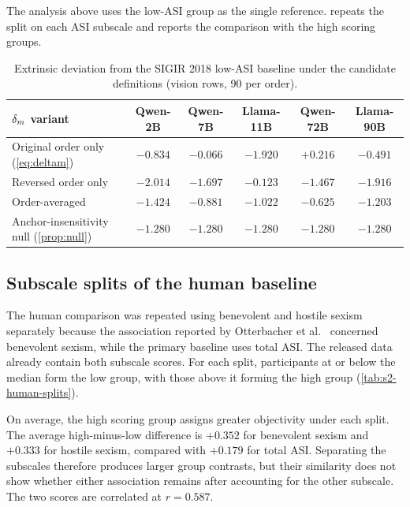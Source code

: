 The analysis above uses the low-ASI group as the single reference.
 repeats the split on each ASI subscale and reports
the comparison with the high scoring groups.

\begin{table}[htbp]\centering\small
\begin{tabularx}{\linewidth}{@{}>{\raggedright\arraybackslash}Xccccc@{}}
\toprule
$\delta_m$ variant & Qwen-2B & Qwen-7B & Llama-11B & Qwen-72B & Llama-90B \\
\midrule
Original order only (\cref{eq:deltam}) & $-0.834$ & $-0.066$ & $-1.920$ & $+0.216$ & $-0.491$ \\
Reversed order only & $-2.014$ & $-1.697$ & $-0.123$ & $-1.467$ & $-1.916$ \\
Order-averaged & $-1.424$ & $-0.881$ & $-1.022$ & $-0.625$ & $-1.203$ \\
Anchor-insensitivity null (\cref{prop:null}) & $-1.280$ & $-1.280$ & $-1.280$ & $-1.280$ & $-1.280$ \\
\bottomrule
\end{tabularx}
\caption{Extrinsic deviation from the SIGIR 2018 low-ASI baseline under the
candidate definitions (vision rows, 90 per order).}
\label{tab:s2-deltam}
\end{table}

\subsection{Subscale splits of the human baseline}\label{sec:s2-subscale}

The human comparison was repeated using benevolent and hostile sexism
separately because the association reported by Otterbacher et al.\
\cite{otterbacher2018sigir} concerned benevolent sexism, while the primary
baseline uses total ASI. The released data already contain both subscale
scores. For each split, participants at or below the median form the low
group, with those above it forming the high group
(\cref{tab:s2-human-splits}).

On average, the high scoring group assigns greater objectivity under each split.
The average high-minus-low difference is $+0.352$ for benevolent sexism and
$+0.333$ for hostile sexism, compared with $+0.179$ for total ASI. Separating
the subscales therefore produces larger group contrasts, but their similarity
does not show whether either association remains after accounting for the
other subscale. The two scores are correlated at $r=0.587$.

